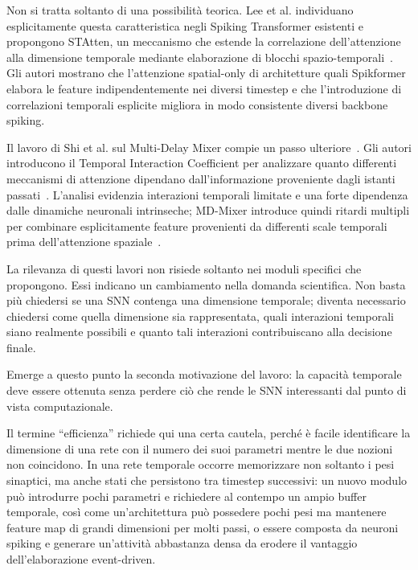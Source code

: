 Non si tratta soltanto di una possibilità teorica. Lee et al. individuano esplicitamente questa caratteristica negli Spiking Transformer esistenti e propongono STAtten, un meccanismo che estende la correlazione dell'attenzione alla dimensione temporale mediante elaborazione di blocchi spazio-temporali~\cite{lee2025spiking}. Gli autori mostrano che l'attenzione spatial-only di architetture quali Spikformer elabora le feature indipendentemente nei diversi timestep e che l'introduzione di correlazioni temporali esplicite migliora in modo consistente diversi backbone spiking.

Il lavoro di Shi et al. sul Multi-Delay Mixer compie un passo ulteriore~\cite{shi2026multidelay}. Gli autori introducono il Temporal Interaction Coefficient per analizzare quanto differenti meccanismi di attenzione dipendano dall'informazione proveniente dagli istanti passati~\cite{shi2026multidelay}. L'analisi evidenzia interazioni temporali limitate e una forte dipendenza dalle dinamiche neuronali intrinseche; MD-Mixer introduce quindi ritardi multipli per combinare esplicitamente feature provenienti da differenti scale temporali prima dell'attenzione spaziale~\cite{shi2026multidelay}.

La rilevanza di questi lavori non risiede soltanto nei moduli specifici che propongono. Essi indicano un cambiamento nella domanda scientifica. Non basta più chiedersi se una SNN contenga una dimensione temporale; diventa necessario chiedersi come quella dimensione sia rappresentata, quali interazioni temporali siano realmente possibili e quanto tali interazioni contribuiscano alla decisione finale.

Emerge a questo punto la seconda motivazione del lavoro: la capacità temporale deve essere ottenuta senza perdere ciò che rende le SNN interessanti dal punto di vista computazionale.

Il termine ``efficienza'' richiede qui una certa cautela, perché è facile identificare la dimensione di una rete con il numero dei suoi parametri mentre le due nozioni non coincidono. In una rete temporale occorre memorizzare non soltanto i pesi sinaptici, ma anche stati che persistono tra timestep successivi: un nuovo modulo può introdurre pochi parametri e richiedere al contempo un ampio buffer temporale, così come un'architettura può possedere pochi pesi ma mantenere feature map di grandi dimensioni per molti passi, o essere composta da neuroni spiking e generare un'attività abbastanza densa da erodere il vantaggio dell'elaborazione event-driven.

